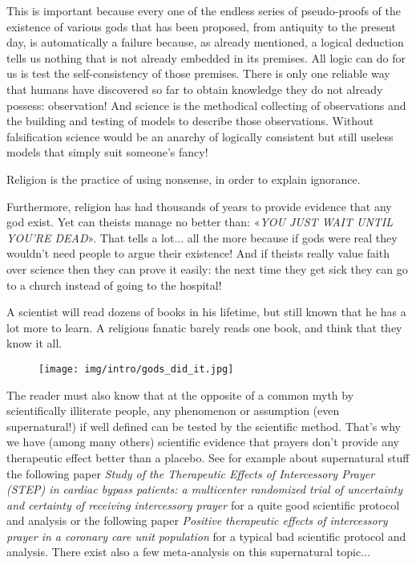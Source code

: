 	This is important because every one of the endless series of pseudo-proofs of the existence of various gods that has been proposed, from antiquity to the present day, is automatically a failure because, as already mentioned, a logical deduction tells us nothing that is not already embedded in its premises. All logic can do for us is test the self-consistency of those premises. There is only one reliable way that humans have discovered so far to obtain knowledge they do not already possess: observation! And science is the methodical collecting of observations and the building and testing of models to describe those observations. Without falsification science would be an anarchy of logically consistent but still useless models that simply suit someone's fancy!
	
	\begin{fquote}Religion is the practice of using nonsense, in order to explain ignorance.
 	\end{fquote}
	
	Furthermore, religion has had thousands of years to provide evidence that any god exist. Yet can theists manage no better than: «\textit{YOU JUST WAIT UNTIL YOU'RE DEAD}». That tells a lot... all the more because if gods were real they wouldn't need people to argue their existence! And if theists really value faith over science then they can prove it easily: the next time they get sick they can go to a church instead of going to the hospital!
	
	\begin{fquote}A scientist will read dozens of books in his lifetime, but still known that he has a lot more to learn. A religious fanatic barely reads one book, and think that they know it all.
 	\end{fquote}
 	
 	\begin{figure}[H]
		\centering
		\texttt{[image: img/intro/gods\_did\_it.jpg]}
	\end{figure} 

	The reader must also know that at the opposite of a common myth by scientifically illiterate people, any phenomenon or assumption (even supernatural!) if well defined can be tested by the scientific method. That's why we have (among many others) scientific evidence that prayers don't provide any therapeutic effect better than a placebo. See for example about supernatural stuff the following paper \textit{Study of the Therapeutic Effects of Intercessory Prayer (STEP) in cardiac bypass patients: a multicenter randomized trial of uncertainty and certainty of receiving intercessory prayer} \cite{benson2006study} for a quite good scientific protocol and analysis or the following paper \textit{Positive therapeutic effects of intercessory prayer in a coronary care unit population} \cite{byrd1988positive} for a typical bad scientific protocol and analysis. There exist also a few meta-analysis on this supernatural topic...
	
